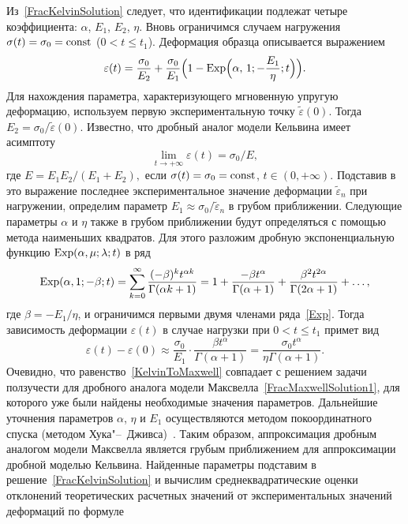 Из~\eqref{FracKelvinSolution} следует, что идентификации подлежат четыре коэффициента: $\alpha$, $E_{1}$, $E_{2}$, $\eta$. Вновь ограничимся случаем нагружения $\sigma(t)=\sigma_{0}=\rm const$ ($0<t\leq t_{1}$). Деформация образца описывается выражением
\begin{equation}
\label{FracKelvinSolution2}
\varepsilon(t)=\frac{\sigma_{0}}{E_{2}}+\frac{\sigma_{0}}{E_{1}}\Bigl(1-{\rm Exp}\Bigl(\alpha,\,1;-\frac{E_{1}}{\eta};t\Bigl)\Bigr).
\end{equation}
Для нахождения параметра, характеризующего мгновенную упругую деформацию, используем первую экспериментальную точку $\tilde{\varepsilon}(0)$. Тогда $E_{2}=\sigma_{0}/\tilde{\varepsilon}(0)$. Известно, что дробный аналог модели Кельвина имеет асимптоту~\cite{OgoRadUng16}
\begin{equation*}
\lim_{t\to+\infty}\varepsilon(t)={\sigma_{0}}/{E},
\end{equation*}
где $E=E_{1}E_{2}/(E_{1}+E_{2}),$ если $\sigma(t)=\sigma_{0}=\rm const$, $t\in(0,+\infty)$. Подставив в это выражение последнее экспериментальное значение деформации $\tilde{\varepsilon}_{n}$ при нагружении, определим параметр
$E_{1}\approx{\sigma_{0}}/{\tilde{\varepsilon}_{n}}$ в грубом приближении. Следующие параметры $\alpha$ и $\eta$ также в грубом приближении будут определяться с помощью метода наименьших квадратов. Для этого разложим дробную экспоненциальную функцию ${\rm Exp}(\alpha,\mu;\lambda;t)$ в ряд~\cite{Ogorodnikov_Some_Special_Functions}
\begin{multline}\label{Exp}
{\rm Exp}(\alpha,1;-\beta;t)=\sum^{\infty}_{k=0}\frac{(-\beta)^{k}t^{\alpha k}}{\Gamma(\alpha k+1)}=1+\frac{-\beta t^{\alpha}}{\Gamma(\alpha+1)}+\frac{\beta^{2}t^{2\alpha}}{\Gamma(2\alpha+1)}+\ldots,
\end{multline}
где $\beta=-{E_{1}}/{\eta}$, и ограничимся первыми двумя членами ряда~\eqref{Exp}. Тогда зависимость деформации $\varepsilon(t)$  в случае нагрузки при $0<t\leq t_{1}$ примет вид
\begin{equation}\label{KelvinToMaxwell}
\varepsilon(t)-\varepsilon(0)\approx\frac{\sigma_{0}}{E_{1}}\cdot\frac{\beta t^{\alpha}}{\Gamma(\alpha+1)}=\frac{\sigma_{0}t^{\alpha}}{\eta\Gamma(\alpha+1)}.
\end{equation}
Очевидно, что равенство~\eqref{KelvinToMaxwell} совпадает с решением задачи ползучести для дробного аналога модели Максвелла~\eqref{FracMaxwellSolution1}, для которого уже были найдены необходимые  значения параметров.
Дальнейшие уточнения параметров $\alpha$, $\eta$ и $E_{1}$ осуществляются методом покоординатного спуска (методом Хука"--~Дживса)~\cite{Huk}.
Таким образом, аппроксимация дробным аналогом модели Максвелла является грубым приближением для аппроксимации дробной моделью Кельвина.
Найденные параметры подставим в решение~\eqref{FracKelvinSolution} и вычислим среднеквадратические оценки отклонений теоретических расчетных значений от экспериментальных значений деформаций по формуле

